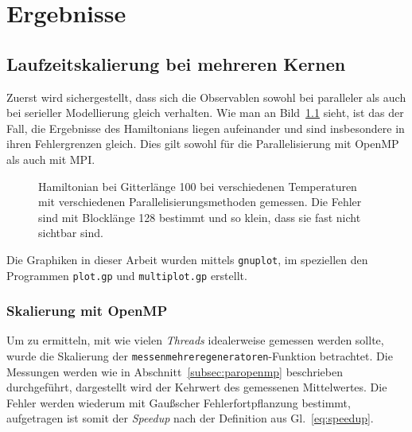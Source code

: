 	\chapter{Ergebnisse}
	\label{chap:ergebnisse}
	
	
	\section{Laufzeitskalierung bei mehreren Kernen}
	\label{sec:ergebnisparallel}
	Zuerst wird sichergestellt, dass sich die Observablen sowohl bei paralleler als auch bei serieller Modellierung gleich verhalten. Wie man an Bild~\ref{fig:vergleichham} sieht, ist das der Fall, die Ergebnisse des Hamiltonians liegen aufeinander und sind insbesondere in ihren Fehlergrenzen gleich. Dies gilt sowohl für die Parallelisierung mit OpenMP als auch mit MPI.
	
	\begin{figure}[htbp]
		
		\caption[Hamiltonian mit und ohne Parallelisierung]{Hamiltonian bei Gitterlänge 100 bei verschiedenen Temperaturen mit verschiedenen Parallelisierungsmethoden gemessen. Die Fehler sind mit Blocklänge 128 bestimmt und so klein, dass sie fast nicht sichtbar sind.}
		\label{fig:vergleichham}
	\end{figure}
	
	Die Graphiken in dieser Arbeit wurden mittels \texttt{gnuplot}\cite{gnuplotdoc}, im speziellen den Programmen \texttt{plot.gp} und \texttt{multiplot.gp} erstellt.
	
	\subsection{Skalierung mit OpenMP}
	\label{subsec:ergebnisseopenmp}
	
	Um zu ermitteln, mit wie vielen \textit{Threads} idealerweise gemessen werden sollte, wurde die Skalierung der \texttt{messenmehreregeneratoren}-Funktion betrachtet. Die Messungen werden wie in Abschnitt~\ref{subsec:paropenmp} beschrieben durchgeführt, dargestellt wird der Kehrwert des gemessenen Mittelwertes. Die Fehler werden wiederum mit Gaußscher Fehlerfortpflanzung bestimmt, aufgetragen ist somit der \textit{Speedup} nach der Definition aus Gl.~\ref{eq:speedup}.%
	
